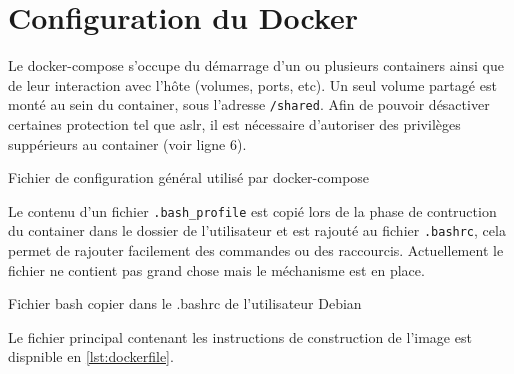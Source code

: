 \chapter{Configuration du Docker}
\label{chap:dockerConf}

Le docker-compose s'occupe du démarrage d'un ou plusieurs containers ainsi que de leur interaction avec l'hôte (volumes, ports, etc). Un seul volume partagé est monté au sein du container, sous l'adresse \texttt{/shared}. Afin de pouvoir désactiver certaines protection tel que \gls{aslr}, il est nécessaire d'autoriser des privilèges suppérieurs au container (voir ligne 6).

\begin{listing}
	\caption{Fichier de configuration général utilisé par docker-compose}
	\label{lst:dockerCompose}
\end{listing}

Le contenu d'un fichier \texttt{.bash_profile} est copié lors de la phase de contruction du container dans le dossier de l'utilisateur et est rajouté au fichier \texttt{.bashrc}, cela permet de rajouter facilement des commandes ou des raccourcis. Actuellement le fichier ne contient pas grand chose mais le méchanisme est en place.

\begin{listing}
	\caption{Fichier bash copier dans le .bashrc de l'utilisateur Debian}
	\label{lst:bashProfile}
\end{listing}

Le fichier principal contenant les instructions de construction de l'image est dispnible en \autoref{lst:dockerfile}.
